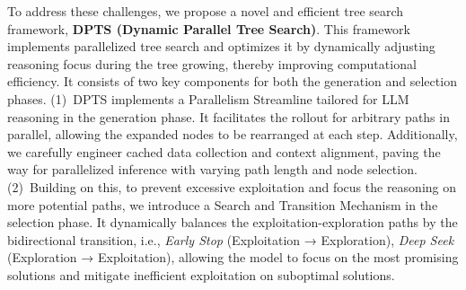 

To address these challenges, we propose a novel and efficient tree search framework, \textbf{DPTS (Dynamic Parallel Tree Search)}. 
This framework implements parallelized tree search and optimizes it by dynamically adjusting reasoning focus during the tree growing, thereby improving computational efficiency. 
It consists of two key components for both the generation and selection phases. 
(1)~DPTS implements a Parallelism Streamline tailored for LLM reasoning in the generation phase. It facilitates the rollout for arbitrary paths in parallel, allowing the expanded nodes to be rearranged at each step. 
Additionally, we carefully engineer cached data collection and context alignment, paving the way for parallelized inference with varying path length and node selection. 
(2)~Building on this, to prevent excessive exploitation and focus the reasoning on more potential paths,  
we introduce a Search and Transition Mechanism in the selection phase. 
It dynamically balances the exploitation-exploration paths by the bidirectional transition, i.e., \textit{Early Stop} (Exploitation → Exploration), \textit{Deep Seek} (Exploration → Exploitation), allowing the model to focus on the most promising solutions and mitigate inefficient exploitation on suboptimal solutions. 

